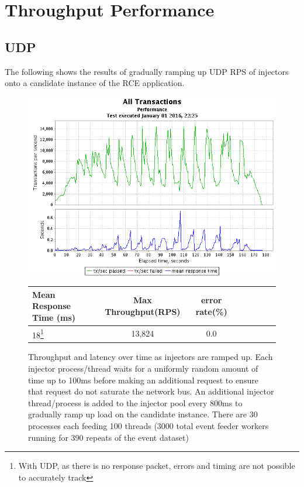 \documentclass[a4paper,11pt]{scrreprt}
\makeatletter
\newcommand\footnoteref[1]{\protected@xdef\@thefnmark{\ref{#1}}\@footnotemark}
\makeatother
\begin{document}
\section{Throughput Performance}
\subsection{UDP}
The following shows the results of gradually ramping up UDP RPS of injectors onto a candidate instance of the RCE application.

\begin{figure}[h!]
\centering
\caption{Throughput and latency over time as injectors are ramped up. Each injector process/thread waits for a uniformly random amount of time up to 100ms before making an additional request to ensure that request do not saturate the network bus. An additional injector thread/process is added to the injector pool every 800ms to gradually ramp up load on the candidate instance. There are 30 processes each feeding 100 threads (3000 total event feeder workers running for 390 repeats of the event dataset)}
\includegraphics[scale=0.6, trim=0 -25 0 2, clip=true] {UDP_throughput.png}
\label{fig:udpthroughput}
\begin{tabular}{l*{6}{c}r}
Mean Response Time (ms) & Max Throughput(RPS) & error rate(\%)\\
\hline
18\footnote{\label{UDP_errors}With UDP, as there is no response packet, errors and timing are not possible to accurately track} & 13,824 & 0.0\footnoteref{UDP_errors}
\end{tabular}
\end{figure}
\clearpage
\end{document}
